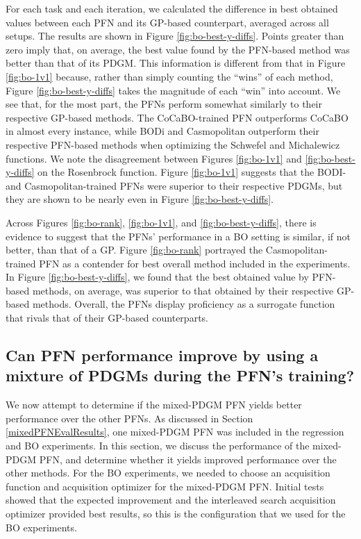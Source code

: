 \documentclass[12pt,twoside]{reedthesis}
\begin{document}
For each task and each iteration, we calculated the difference in best obtained values between each PFN and its GP-based counterpart, averaged across all setups. The results are shown in Figure \ref{fig:bo-best-y-diffs}. Points greater than zero imply that, on average, the best value found by the PFN-based method was better than that of its PDGM. This information is different from that in Figure \ref{fig:bo-1v1} because, rather than simply counting the ``wins'' of each method, Figure \ref{fig:bo-best-y-diffs} takes the magnitude of each ``win'' into account. We see that, for the most part, the PFNs perform somewhat similarly to their respective GP-based methods. The CoCaBO-trained PFN outperforms CoCaBO in almost every instance, while BODi and Casmopolitan outperform their respective PFN-based methods when optimizing the Schwefel and Michalewicz functions. We note the disagreement between Figures \ref{fig:bo-1v1} and \ref{fig:bo-best-y-diffs} on the Rosenbrock function. Figure \ref{fig:bo-1v1} suggests that the BODI- and Casmopolitan-trained PFNs were superior to their respective PDGMs, but they are shown to be nearly even in Figure \ref{fig:bo-best-y-diffs}.

Across Figures \ref{fig:bo-rank}, \ref{fig:bo-1v1}, and \ref{fig:bo-best-y-diffs}, there is evidence to suggest that the PFNs' performance in a BO setting is similar, if not better, than that of a GP. Figure \ref{fig:bo-rank} portrayed the Casmopolitan-trained PFN as a contender for best overall method included in the experiments. In Figure \ref{fig:bo-best-y-diffs}, we found that the best obtained value by PFN-based methods, on average, was superior to that obtained by their respective GP-based methods. Overall, the PFNs display proficiency as a surrogate function that rivals that of their GP-based counterparts.

\hypertarget{rq1-2}{%
\subsection{Can PFN performance improve by using a mixture of PDGMs during the PFN's training?}\label{rq1-2}}

We now attempt to determine if the mixed-PDGM PFN yields better performance over the other PFNs. As discussed in Section \ref{mixedPFNEvalResults}, one mixed-PDGM PFN was included in the regression and BO experiments. In this section, we discuss the performance of the mixed-PDGM PFN, and determine whether it yields improved performance over the other methods. For the BO experiments, we needed to choose an acquisition function and acquisition optimizer for the mixed-PDGM PFN. Initial tests showed that the expected improvement and the interleaved search acquisition optimizer provided best results, so this is the configuration that we used for the BO experiments.
\end{document}

